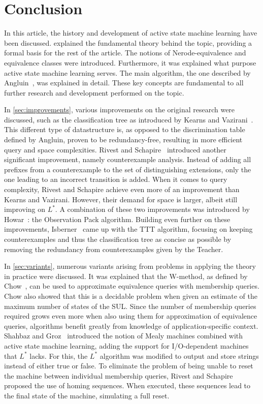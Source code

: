 \section*{Conclusion}
\label{sec:conclusion}
In this article, the history and development of active state machine learning
have been discussed.  explained the fundamental theory behind the
topic, providing a formal basis for the rest of the article. The notions of
Nerode-equivalence and equivalence classes were introduced. Furthermore, it was
explained what purpose active state machine learning serves. The main algorithm,
the one described by Angluin~\cite{Angluin1987}, was explained in detail. These
key concepts are fundamental to all further research and development performed
on the topic.

In \cref{sec:improvements}, various improvements on the original research were discussed,
such as the classification tree as introduced by Kearns and Vazirani~\cite{Kearns1994}.
This different type of datastructure is, as opposed to the discrimination table
defined by Angluin, proven to be redundancy-free, resulting in more efficient
query and space complexities. Rivest and Schapire~\cite{Rivest1993} introduced
another significant improvement, namely counterexample analysis. Instead of
adding all prefixes from a counterexample to the set of distinguishing
extensions, only the one leading to an incorrect transition is added. When it
comes to query complexity, Rivest and Schapire achieve even more of an improvement
than Kearns and Vazirani. However, their demand for space is larger, albeit
still improving on $L^*$. A combination of these two improvements was introduced
by Howar~\cite{Howar2012a,Isberner2015a}: the Observation Pack algorithm.
Building even further on these improvements, Isberner~\cite{Isberner2014b} came
up with the TTT algorithm, focusing on keeping counterexamples and thus the
classification tree as concise as possible by removing the redundancy from
counterexamples given by the Teacher.

In \cref{sec:variants}, numerous variants arising from problems in applying
the theory in practice were discussed. It was explained that the W-method,
as defined by Chow~\cite{deRuiter2015,Chow1978}, can be used to approximate equivalence
queries with membership queries. Chow also showed that this is a decidable problem
when given an estimate of the maximum number of states of the SUL.
Since the number of membership queries required grows even more when also using
them for approximation of equivalence queries, algorithms benefit greatly from
knowledge of application-specific context.
Shahbaz and Groz~\cite{Shahbaz2009}
introduced the notion of Mealy machines combined with active state machine
learning, adding the support for I/O-dependent machines that $L^*$ lacks. For
this, the $L^*$ algorithm was modified to output and store strings instead of
either true or false. To eliminate the problem of being unable to reset the
machine between individual membership queries, Rivest and Schapire~\cite{Rivest1993}
proposed the use of homing sequences. When executed, these sequences lead to the
final state of the machine, simulating a full reset.

